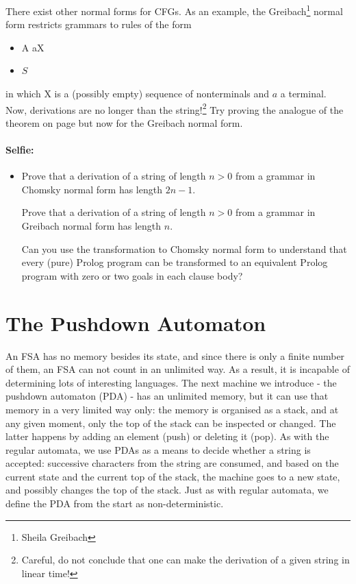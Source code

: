 There exist other normal forms for CFGs. As an example, the
Greibach\footnote{Sheila Greibach} normal form restricts grammars to
rules of the form
\begin{itemize}
\item A \rpijl aX
\item $S$ \rpijl \eps
\end{itemize}
in which X is a (possibly empty) sequence of nonterminals and $a$ a
terminal. Now, derivations are no longer than the
string!\footnote{Careful, do not conclude that one can make the
  derivation of a given string in linear time!} Try proving the
analogue of the theorem on page \pageref{chomskynormalform} but now
for the Greibach normal form.

\paragraph{Selfie:}
\begin{itemize}
\item[]
Prove that a derivation of a string of length $n > 0$ from a grammar
in Chomsky normal form has length $2n-1$.

Prove that a derivation of a string of length $n > 0$ from a grammar
in Greibach normal form has length $n$.

Can you use the transformation to Chomsky normal form to understand
that every (pure) Prolog program can be transformed to an equivalent
Prolog program with zero or two goals in each clause body?
\end{itemize}



\section{The Pushdown Automaton}

An FSA has no memory besides its state, and since there is only a
finite number of them, an FSA can not count in an unlimited way. As a
result, it is incapable of determining lots of interesting
languages. The next machine we introduce - the pushdown automaton
(PDA) - has an unlimited memory, but it can use that memory in a very
limited way only: the memory is organised as a stack, and at any given
moment, only the top of the stack can be inspected or changed. The
latter happens by adding an element (push) or deleting it (pop).
As with the regular automata, we use PDAs as a means to decide whether
a string is accepted: successive characters from the string are
consumed, and based on the current state and the current top of the
stack, the machine goes to a new state, and possibly changes the top
of the stack. Just as with regular automata, we define the PDA from
the start as non-deterministic.


